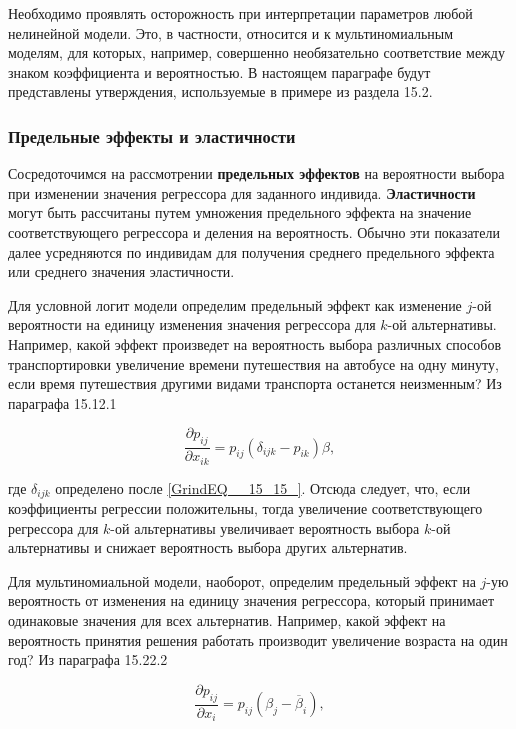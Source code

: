 Необходимо проявлять осторожность при интерпретации параметров любой нелинейной модели. Это, в частности, относится и к мультиномиальным моделям, для которых, например, совершенно необязательно соответствие между знаком коэффициента и вероятностью. В настоящем параграфе будут представлены утверждения, используемые в примере из раздела 15.2.

\subsubsection*{Предельные эффекты и эластичности}

Сосредоточимся на рассмотрении \textbf{предельных эффектов} на вероятности выбора при изменении значения регрессора для заданного индивида. \textbf{Эластичности } могут быть рассчитаны путем умножения предельного эффекта на значение соответствующего регрессора и деления на вероятность. Обычно эти показатели далее усредняются по индивидам для получения среднего предельного эффекта или среднего значения эластичности.

Для условной логит модели определим предельный эффект как изменение $j$-ой вероятности на единицу изменения значения регрессора для $k$-ой альтернативы. Например, какой эффект произведет на вероятность выбора различных способов транспортировки увеличение времени путешествия на автобусе на одну минуту, если время путешествия другими видами транспорта останется неизменным? Из параграфа 15.12.1

\begin{equation} \label{GrindEQ__15_18_} \frac{\partial p_{ij}}{\partial x_{ik}}=p_{ij}\left({\delta }_{ijk}-p_{ik}\right)\beta , \end{equation} 

где ${\delta }_{ijk}$ определено после \eqref{GrindEQ__15_15_}. Отсюда следует, что, если коэффициенты регрессии положительны, тогда увеличение соответствующего  регрессора для $k$-ой альтернативы увеличивает вероятность выбора $k$-ой альтернативы и снижает вероятность выбора других альтернатив.

Для мультиномиальной модели, наоборот, определим предельный эффект на $j$-ую вероятность от изменения на единицу значения регрессора, который принимает одинаковые значения для всех альтернатив. Например, какой эффект на вероятность принятия решения работать производит увеличение возраста на один год? Из параграфа 15.22.2

\begin{equation} \label{GrindEQ__15_19_} \frac{\partial p_{ij}}{\partial x_i}=p_{ij}\left({\beta }_j-{\overline{\beta }}_i\right), \end{equation} 

